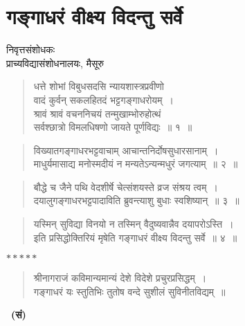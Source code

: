 {\fontsize{16}{18}\selectfont
\presetvalues

\chapter{गङ्गाधरं वीक्ष्य विदन्तु सर्वे}
\begin{center}
\smallskip

निवृत्तसंशोधकः\\ 
प्राच्यविद्यासंशोधनालयः,  मैसूरु
\addrule
\end{center}

\begin{verse}
धत्ते शोभां विबुधसदसि न्यायशास्त्रप्रवीणो\\
वादं कुर्वन् सकलहितदं भट्टगङ्गाधरोयम्~।\\
श्रावं श्रावं वचननिचयं तन्मुखाम्भोरुहोत्थं\\
सर्वश्छात्रो विमलधिषणो जायते पूर्णविद्यः~॥ १~॥
\end{verse}

\begin{verse}
विख्यातगङ्गाधरभट्टवाचाम् आचान्तनिर्दोषसुधारसानाम्~।\\
माधुर्यमासाद्य मनोस्मदीयं न मन्यतेऽन्यन्मधुरं जगत्याम्~॥ २~॥
\end{verse}

\begin{verse}
बौद्धे च जैने पथि वेदशीर्षे चेत्संशयस्ते व्रज संश्रय त्वम्~।\\
दयालुगङ्गाधरभट्टपादाविति ब्रुवन्त्याशु बुधाः स्वशिष्यान्~॥ ३~॥
\end{verse}

\begin{verse}
यस्मिन् सुविद्या विनयो न तस्मिन् वैदुष्यवान्नैव दयापरोऽस्ति~।\\
इति प्रसिद्धोक्तिरियं मृषेति गङ्गाधरं वीक्ष्य विदन्तु सर्वे~॥ ४~॥
\end{verse}

\centerline{$*****$}

\begin{verse}
श्रीनागराजं कविमान्यमान्यं देशे विदेशे प्रचुरप्रसिद्धम्~।\\
गङ्गाधरं यः स्तुतिभिः तुतोष वन्दे सुशीलं सुविनीतविद्यम्~॥
\end{verse}

~\hfill\textbf{(सं)}\hspace{2cm}

\articleend
}
